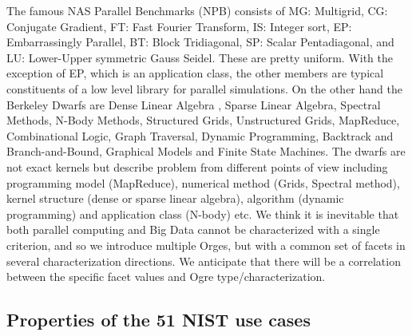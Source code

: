 \documentclass{acm_proc_article-sp}
\begin{document}
The famous NAS Parallel Benchmarks (NPB) consists of MG: Multigrid, CG: Conjugate Gradient, FT: Fast Fourier Transform, IS: Integer sort, EP: Embarrassingly Parallel, BT: Block Tridiagonal, SP: Scalar Pentadiagonal, and LU: Lower-Upper symmetric Gauss Seidel. These are pretty uniform. With the exception of EP, which is an application class, the other members are typical constituents of a low level library for parallel simulations. On the other hand the Berkeley Dwarfs are Dense Linear Algebra , Sparse Linear Algebra, Spectral Methods, N-Body Methods, Structured Grids, Unstructured Grids, MapReduce, Combinational Logic, Graph Traversal, Dynamic Programming, Backtrack and Branch-and-Bound, Graphical Models and Finite State Machines. The dwarfs are not exact kernels but describe problem from different points of view including programming model (MapReduce), numerical method (Grids, Spectral method), kernel structure (dense or sparse linear algebra), algorithm (dynamic programming) and application class (N-body) etc. We think it is inevitable that both parallel computing and Big Data cannot be characterized with a single criterion, and so we introduce multiple Orges, but with a common set of facets in several characterization directions. We anticipate that there will be a correlation between the specific facet values and Ogre type/characterization.


\subsection{Properties of the 51 NIST use cases}
\end{document}
